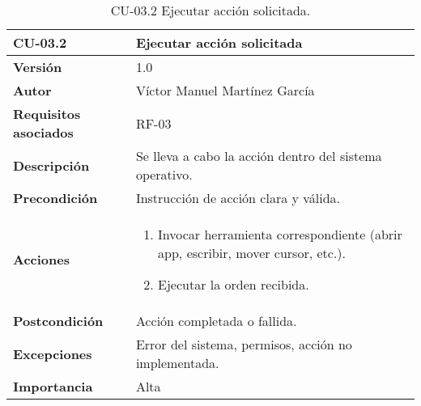 \begin{table}[p]
    \centering
    \begin{tabularx}{\linewidth}{ p{} p{} }
        \toprule
        \textbf{CU-03.2}    & \textbf{Ejecutar acción solicitada}\\
        \toprule
        \textbf{Versión}              & 1.0 \\
        \textbf{Autor}                & Víctor Manuel Martínez García \\
        \textbf{Requisitos asociados} & RF-03 \\
        \textbf{Descripción}          & Se lleva a cabo la acción dentro del sistema operativo.\\
        \textbf{Precondición}         & Instrucción de acción clara y válida.\\
        \textbf{Acciones}             &
        \begin{enumerate}
          \item Invocar herramienta correspondiente (abrir app, escribir, mover cursor, etc.).
          \item Ejecutar la orden recibida.
        \end{enumerate}\\
        \textbf{Postcondición}        & Acción completada o fallida.\\
        \textbf{Excepciones}          & Error del sistema, permisos, acción no implementada.\\
        \textbf{Importancia}          & Alta \\
        \bottomrule
    \end{tabularx}
    \caption{CU-03.2 Ejecutar acción solicitada.}
    \label{CU-03.2 Ejecutar accion solicitada}
\end{table}


